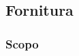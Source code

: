 \documentclass[../norme-di-progetto.tex]{subfiles}
\begin{document}
    
\subsection{Fornitura}
\subsubsection{Scopo}
\end{document}
